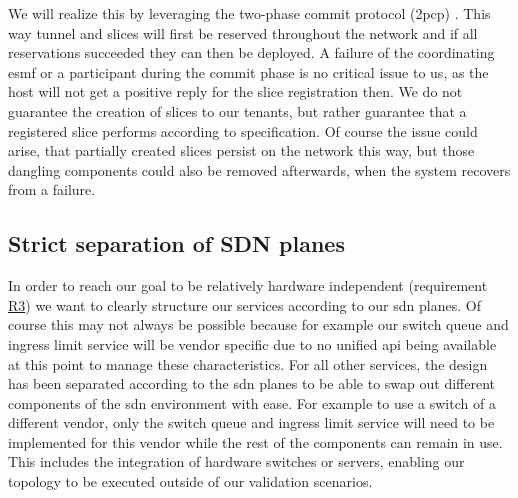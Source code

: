 We will realize this by leveraging the two-phase commit protocol (\acrshort{2pcp}) \cite{2pcp}. This way tunnel and slices will first be reserved throughout the network and if all reservations succeeded they can then be deployed. A failure of the coordinating \acrshort{esmf} or a participant during the commit phase is no critical issue to us, as the host will not get a positive reply for the slice registration then. We do not guarantee the creation of slices to our tenants, but rather guarantee that a registered slice performs according to specification. Of course the issue could arise, that partially created slices persist on the network this way, but those dangling components could also be removed afterwards, when the system recovers from a failure.

\subsection{Strict separation of SDN planes}
In order to reach our goal to be relatively hardware independent (requirement \hyperref[R3]{R3}) we want to clearly structure our services according to our \acrshort{sdn} planes. Of course this may not always be possible because for example our switch queue and ingress limit service will be vendor specific due to no unified \acrshort{api} being available at this point to manage these characteristics. For all other services, the design has been separated according to the \acrshort{sdn} planes to be able to swap out different components of the \acrshort{sdn} environment with ease. For example to use a switch of a different vendor, only the switch queue and ingress limit service will need to be implemented for this vendor while the rest of the components can remain in use. This includes the integration of hardware switches or servers, enabling our topology to be executed outside of our validation scenarios.